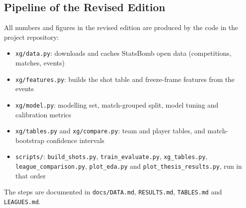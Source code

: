 \subsection{Pipeline of the Revised Edition}
\label{sec:revised-pipeline}
{\sloppy All numbers and figures in the revised edition are produced by the code in the project repository:
\begin{itemize}
    \item \texttt{xg/data.py}: downloads and caches StatsBomb open data (competitions, matches, events)
    \item \texttt{xg/features.py}: builds the shot table and freeze-frame features from the events
    \item \texttt{xg/model.py}: modelling set, match-grouped split, model tuning and calibration metrics
    \item \texttt{xg/tables.py} and \texttt{xg/compare.py}: team and player tables, and match-bootstrap confidence intervals
    \item \texttt{scripts/}: \texttt{build\_shots.py}, \texttt{train\_evaluate.py}, \texttt{xg\_tables.py}, \texttt{league\_comparison.py}, \texttt{plot\_eda.py} and \texttt{plot\_thesis\_results.py}, run in that order
\end{itemize}
The steps are documented in \texttt{docs/DATA.md}, \texttt{RESULTS.md}, \texttt{TABLES.md} and \texttt{LEAGUES.md}.\par}

\newpage

